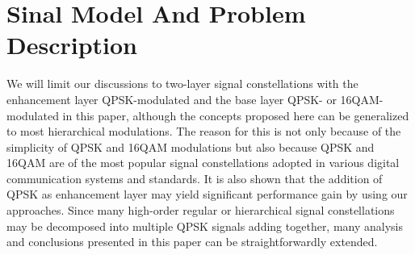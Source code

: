 \documentclass[10pt,fleqn, twocolumn]{IEEEtran}
\begin{document}
\section{Sinal Model And Problem Description}
We will limit our discussions to two-layer signal constellations
with the enhancement layer QPSK-modulated and the base layer QPSK-
or 16QAM-modulated in this paper, although the concepts proposed
here can be generalized to most hierarchical modulations. The
reason for this is not only because of the simplicity of QPSK and
16QAM modulations but also because QPSK and 16QAM are of the most
popular signal constellations adopted in various digital
communication systems and standards. It is also shown that the
addition of QPSK as enhancement layer may yield significant
performance gain by using our approaches. Since many high-order
regular or hierarchical signal constellations may be decomposed
into multiple QPSK signals adding together, many analysis and
conclusions presented in this paper can be straightforwardly
extended.
\end{document}
